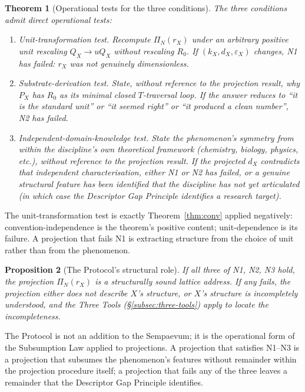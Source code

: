 \documentclass[11pt,a4paper]{article}
\newtheorem{theorem}{Theorem}[section]
\newtheorem{proposition}[theorem]{Proposition}
\theoremstyle{definition}
\theoremstyle{remark}
\begin{document}
\begin{theorem}[Operational tests for the three conditions]\label{thm:N1N2N3}
The three conditions admit direct operational tests:
\begin{enumerate}[leftmargin=*]
\item[\textbf{(N1)}] \emph{Unit-transformation test.} Recompute $\Pi_{N}(r_{X})$ under an arbitrary positive unit rescaling $Q_{X} \to uQ_{X}$ without rescaling $R_{0}$. If $(k_{X}, d_{X}, \varepsilon_{X})$ changes, N1 has failed: $r_{X}$ was not genuinely dimensionless.
\item[\textbf{(N2)}] \emph{Substrate-derivation test.} State, without reference to the projection result, why $P_{X}$ has $R_{0}$ as its minimal closed $T$-traversal loop. If the answer reduces to ``it is the standard unit'' or ``it seemed right'' or ``it produced a clean number'', N2 has failed.
\item[\textbf{(N3)}] \emph{Independent-domain-knowledge test.} State the phenomenon's symmetry from within the discipline's own theoretical framework (chemistry, biology, physics, etc.), without reference to the projection result. If the projected $d_{X}$ contradicts that independent characterisation, either N1 or N2 has failed, or a genuine structural feature has been identified that the discipline has not yet articulated (in which case the Descriptor Gap Principle identifies a research target).
\end{enumerate}
\end{theorem}

The unit-transformation test is exactly Theorem~\ref{thm:conv} applied negatively: convention-independence is the theorem's positive content; unit-dependence is its failure. A projection that fails N1 is extracting structure from the choice of unit rather than from the phenomenon.

\begin{proposition}[The Protocol's structural role]\label{prop:N1N2N3-role}
If all three of N1, N2, N3 hold, the projection $\Pi_{N}(r_{X})$ is a structurally sound lattice address. If any fails, the projection either does not describe $X$'s structure, or $X$'s structure is incompletely understood, and the Three Tools (\S\ref{subsec:three-tools}) apply to locate the incompleteness.
\end{proposition}

The Protocol is not an addition to the Sempaevum; it is the operational form of the Subsumption Law applied to projections. A projection that satisfies N1--N3 is a projection that subsumes the phenomenon's features without remainder within the projection procedure itself; a projection that fails any of the three leaves a remainder that the Descriptor Gap Principle identifies.
\end{document}
